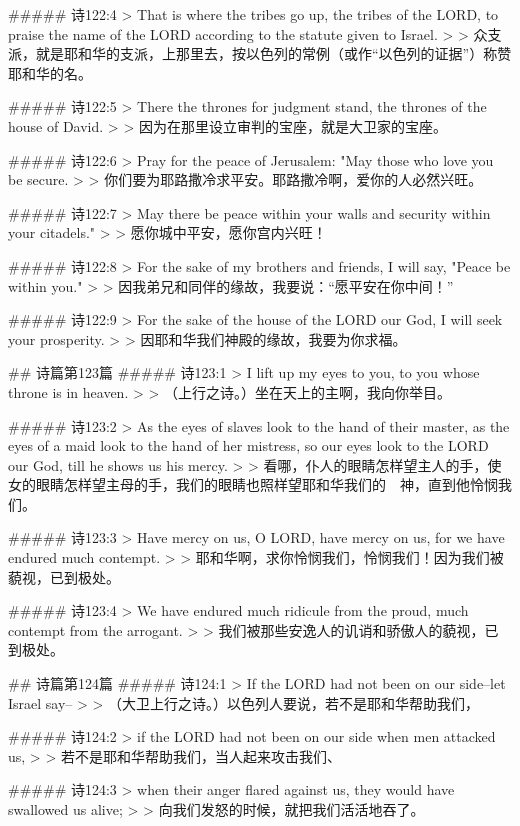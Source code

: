 ##### 诗122:4
> That is where the tribes go up, the tribes of the LORD, to praise the name of the LORD according to the statute given to Israel.
>
> 众支派，就是耶和华的支派，上那里去，按以色列的常例（或作“以色列的证据”）称赞耶和华的名。


##### 诗122:5
> There the thrones for judgment stand, the thrones of the house of David.
>
> 因为在那里设立审判的宝座，就是大卫家的宝座。


##### 诗122:6
> Pray for the peace of Jerusalem: "May those who love you be secure.
>
> 你们要为耶路撒冷求平安。耶路撒冷啊，爱你的人必然兴旺。


##### 诗122:7
> May there be peace within your walls and security within your citadels."
>
> 愿你城中平安，愿你宫内兴旺！


##### 诗122:8
> For the sake of my brothers and friends, I will say, "Peace be within you."
>
> 因我弟兄和同伴的缘故，我要说：“愿平安在你中间！”


##### 诗122:9
> For the sake of the house of the LORD our God, I will seek your prosperity.
>
> 因耶和华我们神殿的缘故，我要为你求福。


## 诗篇第123篇
##### 诗123:1
> I lift up my eyes to you, to you whose throne is in heaven.
>
> （上行之诗。）坐在天上的主啊，我向你举目。


##### 诗123:2
> As the eyes of slaves look to the hand of their master, as the eyes of a maid look to the hand of her mistress, so our eyes look to the LORD our God, till he shows us his mercy.
>
> 看哪，仆人的眼睛怎样望主人的手，使女的眼睛怎样望主母的手，我们的眼睛也照样望耶和华我们的　神，直到他怜悯我们。


##### 诗123:3
> Have mercy on us, O LORD, have mercy on us, for we have endured much contempt.
>
> 耶和华啊，求你怜悯我们，怜悯我们！因为我们被藐视，已到极处。


##### 诗123:4
> We have endured much ridicule from the proud, much contempt from the arrogant.
>
> 我们被那些安逸人的讥诮和骄傲人的藐视，已到极处。


## 诗篇第124篇
##### 诗124:1
> If the LORD had not been on our side--let Israel say--
>
> （大卫上行之诗。）以色列人要说，若不是耶和华帮助我们，


##### 诗124:2
> if the LORD had not been on our side when men attacked us,
>
> 若不是耶和华帮助我们，当人起来攻击我们、


##### 诗124:3
> when their anger flared against us, they would have swallowed us alive;
>
> 向我们发怒的时候，就把我们活活地吞了。


